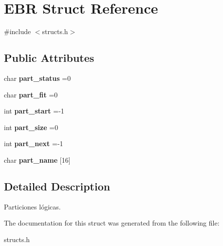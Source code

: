 \hypertarget{structEBR}{}\section{E\+BR Struct Reference}
\label{structEBR}


{\ttfamily \#include $<$structs.\+h$>$}

\subsection*{Public Attributes}
\begin{DoxyCompactItemize}
\item 
\mbox{\label{structEBR_a4ce8f52d4855da2b30a15ed463266e82}} 
char {\bfseries part\+\_\+status} =\textquotesingle{}0\textquotesingle{}
\item 
\mbox{\label{structEBR_a291d77cd42d2bed928d43861f1fad4aa}} 
char {\bfseries part\+\_\+fit} =\textquotesingle{}0\textquotesingle{}
\item 
\mbox{\label{structEBR_a66db820ea0adcca22c76c136e2fabfbe}} 
int {\bfseries part\+\_\+start} =-\/1
\item 
\mbox{\label{structEBR_a4ff5eb013c47054ac5bb1a1d79389d47}} 
int {\bfseries part\+\_\+size} =0
\item 
\mbox{\label{structEBR_a6d2159ec6ead1ac0384b99902180c72b}} 
int {\bfseries part\+\_\+next} =-\/1
\item 
\mbox{\label{structEBR_a365cfcb47bff391be6a06fb65fd1da4f}} 
char {\bfseries part\+\_\+name} \mbox{[}16\mbox{]}
\end{DoxyCompactItemize}


\subsection{Detailed Description}
Particiones lógicas. 

The documentation for this struct was generated from the following file\+:\begin{DoxyCompactItemize}
\item 
structs.\+h\end{DoxyCompactItemize}
